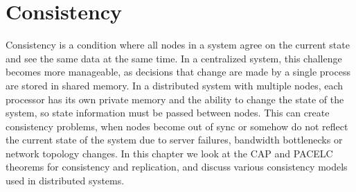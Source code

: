 \chapter{Consistency} \label{ch:consistency}

Consistency is a condition where all nodes in a system agree on the current state and see the same data at the same time. In a centralized system, this challenge becomes more manageable, as decisions that change are made by a single process are stored in shared memory. In a distributed system with multiple nodes, each processor has its own private memory and the ability to change the state of the system, so state information must be passed between nodes. This can create consistency problems, when nodes become out of sync or somehow do not reflect the current state of the system due to server failures, bandwidth bottlenecks or network topology changes. In this chapter we look at the CAP and PACELC theorems for consistency and replication, and discuss various consistency models used in distributed systems.




